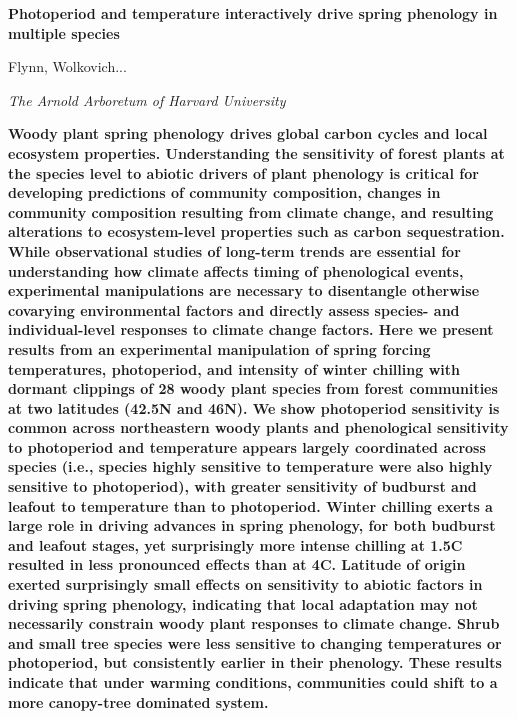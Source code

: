 \documentclass{article}
\begin{document}
\linenumbers

\flushleft
\textbf{\large{Photoperiod and temperature interactively drive spring phenology in multiple species}}

Flynn, Wolkovich...

\textit{The Arnold Arboretum of Harvard University}

\textbf{
Woody plant spring phenology drives global carbon cycles and local ecosystem properties. Understanding the sensitivity of forest plants at the species level to abiotic drivers of plant phenology is critical for developing predictions of community composition, changes in community composition resulting from climate change, and resulting alterations to ecosystem-level properties such as carbon sequestration. While observational studies of long-term trends are essential for understanding how climate affects timing of phenological events, experimental manipulations are necessary to disentangle otherwise covarying environmental factors and directly assess species- and individual-level responses to climate change factors.
Here we present results from an experimental manipulation of spring forcing temperatures, photoperiod, and intensity of winter chilling with dormant clippings of 28 woody plant species from forest communities at two latitudes (42.5\degree N and 46\degree N). We show photoperiod sensitivity is common across northeastern woody plants and phenological sensitivity to photoperiod and temperature appears largely coordinated across species (i.e., species highly sensitive to temperature were also highly sensitive to photoperiod), with greater sensitivity of budburst and leafout to temperature than to photoperiod. Winter chilling exerts a large role in driving advances in spring phenology, for both budburst and leafout stages, yet surprisingly more intense chilling at 1.5\degree C resulted in less pronounced effects than at 4\degree C. Latitude of origin exerted surprisingly small effects on sensitivity to abiotic factors in driving spring phenology, indicating that local adaptation may not necessarily constrain woody plant responses to climate change. Shrub and small tree species were less sensitive to changing temperatures or photoperiod, but consistently earlier in their phenology. These results indicate that under warming conditions, communities could shift to a more canopy-tree dominated system.
}

\end{document}
